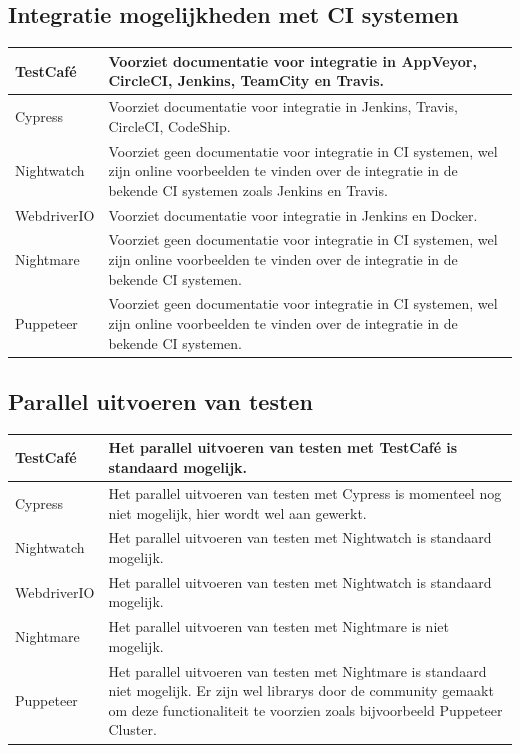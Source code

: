 \subsection{Integratie mogelijkheden met CI systemen}
\begin{tabular}{ | l | p{12cm} | }
\hline
 TestCafé & Voorziet documentatie voor integratie in AppVeyor, CircleCI, Jenkins, TeamCity en Travis.\\
\hline
 Cypress & Voorziet documentatie voor integratie in Jenkins, Travis, CircleCI, CodeShip.\\
\hline
 Nightwatch & Voorziet geen documentatie voor integratie in \gls{CI} systemen, wel zijn online voorbeelden te vinden over de integratie in de bekende \gls{CI} systemen zoals Jenkins en Travis. \\
\hline
 WebdriverIO & Voorziet documentatie voor integratie in Jenkins en Docker.\\
\hline
 Nightmare & Voorziet geen documentatie voor integratie in \gls{CI} systemen, wel zijn online voorbeelden te vinden over de integratie in de bekende \gls{CI} systemen.\\
\hline
 Puppeteer & Voorziet geen documentatie voor integratie in \gls{CI} systemen, wel zijn online voorbeelden te vinden over de integratie in de bekende \gls{CI} systemen.\\
\hline
\end{tabular}
\subsection{Parallel uitvoeren van testen}
\begin{tabular}{ | l | p{12cm} | }
\hline
 TestCafé & Het parallel uitvoeren van testen met TestCafé is standaard mogelijk.\\
\hline
 Cypress & Het parallel uitvoeren van testen met Cypress is momenteel nog niet mogelijk, hier wordt wel aan gewerkt.\\
\hline
 Nightwatch & Het parallel uitvoeren van testen met Nightwatch is standaard mogelijk. \\
\hline
 WebdriverIO & Het parallel uitvoeren van testen met Nightwatch is standaard mogelijk.\\
\hline
 Nightmare & Het parallel uitvoeren van testen met Nightmare is niet mogelijk.\\
\hline
 Puppeteer & Het parallel uitvoeren van testen met Nightmare is standaard niet mogelijk. Er zijn wel \glspl{library} door de community gemaakt om deze functionaliteit te voorzien zoals bijvoorbeeld Puppeteer Cluster.\\
\hline
\end{tabular}

